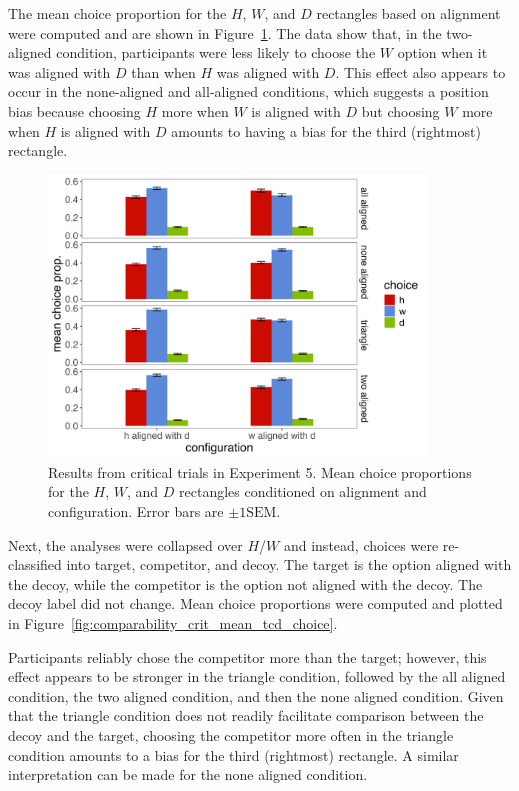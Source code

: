The mean choice proportion for the $H$, $W$, and $D$ rectangles based on alignment were computed and are shown in Figure~\ref{fig:comparability_crit_mean_choices}. The data show that, in the two-aligned condition, participants were less likely to choose the $W$ option when it was aligned with $D$ than when $H$ was aligned with $D$. This effect also appears to occur in the none-aligned and all-aligned conditions, which suggests a position bias because choosing $H$ more when $W$ is aligned with $D$ but choosing $W$ more when $H$ is aligned with $D$ amounts to having a bias for the third (rightmost) rectangle.

\begin{figure}
   \includegraphics[width=100mm]{figures/comparability_crit_mean_hdw_choice_by_config_align.jpeg}
   \caption{Results from critical trials in Experiment 5. Mean choice proportions for the $H$, $W$, and $D$ rectangles conditioned on alignment and configuration. Error bars are $\pm1\mathrm{SEM}$.}
   \label{fig:comparability_crit_mean_choices}
\end{figure}

Next, the analyses were collapsed over $H$/$W$ and instead, choices were re-classified into target, competitor, and decoy. The target is the option aligned with the decoy, while the competitor is the option not aligned with the decoy. The decoy label did not change. Mean choice proportions were computed and plotted in Figure~\ref{fig:comparability_crit_mean_tcd_choice}.

Participants reliably chose the competitor more than the target; however, this effect appears to be stronger in the triangle condition, followed by the all aligned condition, the two aligned condition, and then the none aligned condition. Given that the triangle condition does not readily facilitate comparison between the decoy and the target, choosing the competitor more often in the triangle condition amounts to a bias for the third (rightmost) rectangle. A similar interpretation can be made for the none aligned condition. 


